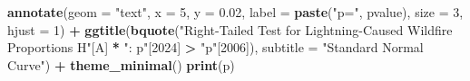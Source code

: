 \documentclass[
]{article}
\newenvironment{Shaded}{\begin{snugshade}}{\end{snugshade}}
\newcommand{\AttributeTok}[1]{\textcolor[rgb]{0.13,0.29,0.53}{#1}}
\newcommand{\DecValTok}[1]{\textcolor[rgb]{0.00,0.00,0.81}{#1}}
\newcommand{\FloatTok}[1]{\textcolor[rgb]{0.00,0.00,0.81}{#1}}
\newcommand{\FunctionTok}[1]{\textcolor[rgb]{0.13,0.29,0.53}{\textbf{#1}}}
\newcommand{\NormalTok}[1]{#1}
\newcommand{\SpecialCharTok}[1]{\textcolor[rgb]{0.81,0.36,0.00}{\textbf{#1}}}
\newcommand{\StringTok}[1]{\textcolor[rgb]{0.31,0.60,0.02}{#1}}
\begin{document}
\begin{Shaded}
\begin{Highlighting}[]
   \FunctionTok{annotate}\NormalTok{(}\AttributeTok{geom =} \StringTok{"text"}\NormalTok{, }\AttributeTok{x =} \DecValTok{5}\NormalTok{, }\AttributeTok{y =} \FloatTok{0.02}\NormalTok{, }\AttributeTok{label =} \FunctionTok{paste}\NormalTok{(}\StringTok{"p="}\NormalTok{, pvalue), }\AttributeTok{size =} \DecValTok{3}\NormalTok{, }\AttributeTok{hjust =} \DecValTok{1}\NormalTok{) }\SpecialCharTok{+}
  \FunctionTok{ggtitle}\NormalTok{(}\FunctionTok{bquote}\NormalTok{(}\StringTok{"Right{-}Tailed Test for Lightning{-}Caused Wildfire Proportions H"}\NormalTok{[A] }\SpecialCharTok{*} \StringTok{": p"}\NormalTok{[}\DecValTok{2024}\NormalTok{] }\SpecialCharTok{\textgreater{}} \StringTok{"p"}\NormalTok{[}\DecValTok{2006}\NormalTok{]),}
          \AttributeTok{subtitle =} \StringTok{"Standard Normal Curve"}\NormalTok{) }\SpecialCharTok{+}
  \FunctionTok{theme\_minimal}\NormalTok{()}
\FunctionTok{print}\NormalTok{(p)}
\end{Highlighting}
\end{Shaded}
\end{document}
